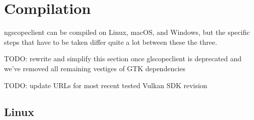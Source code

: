 \section{Compilation}

ngscopeclient can be compiled on Linux, macOS, and Windows, but the specific steps that have to be taken differ quite a
lot between these the three.

TODO: rewrite and simplify this section once glscopeclient is deprecated and we've removed all remaining vestiges of
GTK dependencies

TODO: update URLs for most recent tested Vulkan SDK revision

\subsection{Linux}
